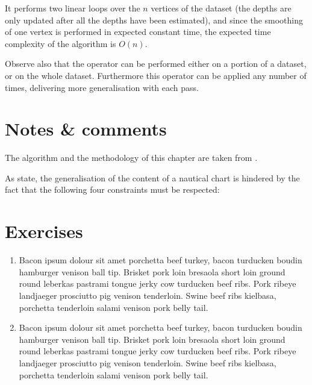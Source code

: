 It performs two linear loops over the $n$ vertices of the dataset (the depths are only updated after all the depths have been estimated), and since the smoothing of one vertex is performed in expected constant time, the expected time complexity of the algorithm is $O(n)$.

Observe also that the operator can be performed either on a portion of a dataset, or on the whole dataset. 
Furthermore this operator can be applied any number of times, delivering more generalisation with each pass.



%
\section{Notes \& comments}

The algorithm and the methodology of this chapter are taken from \citet{Peters14}.

As \citet{Zhang11} state, the generalisation of the content of a nautical chart is hindered by the fact that the following four constraints must be respected:



%
\section{Exercises}

\begin{enumerate}
  \item Bacon ipsum dolour sit amet porchetta beef turkey, bacon turducken boudin hamburger venison ball tip. Brisket pork loin bresaola short loin ground round leberkas pastrami tongue jerky cow turducken beef ribs. Pork ribeye landjaeger prosciutto pig venison tenderloin. Swine beef ribs kielbasa, porchetta tenderloin salami venison pork belly tail.
  \item Bacon ipsum dolour sit amet porchetta beef turkey, bacon turducken boudin hamburger venison ball tip. Brisket pork loin bresaola short loin ground round leberkas pastrami tongue jerky cow turducken beef ribs. Pork ribeye landjaeger prosciutto pig venison tenderloin. Swine beef ribs kielbasa, porchetta tenderloin salami venison pork belly tail.
\end{enumerate}